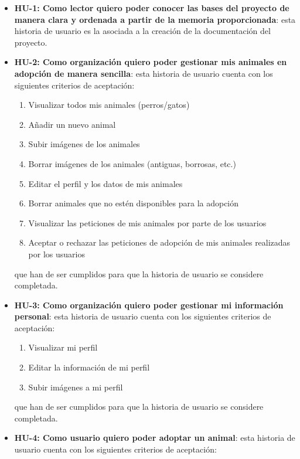 \begin{itemize}
    \item \textbf{HU-1: Como lector quiero poder conocer las bases del proyecto de manera clara y ordenada a partir de
    la memoria proporcionada}: esta historia de usuario es la asociada a la creación de la documentación del proyecto.
    \item \textbf{HU-2: Como organización quiero poder gestionar mis animales en adopción de manera sencilla}: esta
    historia de usuario cuenta con los siguientes criterios de aceptación:
        \begin{enumerate}
            \item Visualizar todos mis animales (perros/gatos)
            \item Añadir un nuevo animal
            \item Subir imágenes de los animales
            \item Borrar imágenes de los animales (antiguas, borrosas, etc.)
            \item Editar el perfil y los datos de mis animales
            \item Borrar animales que no estén disponibles para la adopción
            \item Visualizar las peticiones de mis animales por parte de los usuarios
            \item Aceptar o rechazar las peticiones de adopción de mis animales realizadas por los usuarios
        \end{enumerate}
    que han de ser cumplidos para que la historia de usuario se considere completada.
    \item \textbf{HU-3: Como organización quiero poder gestionar mi información personal}: esta historia de usuario cuenta
    con los siguientes criterios de aceptación:
        \begin{enumerate}
            \item Visualizar mi perfil
            \item Editar la información de mi perfil
            \item Subir imágenes a mi perfil
        \end{enumerate}
    que han de ser cumplidos para que la historia de usuario se considere completada.
    \item \textbf{HU-4: Como usuario quiero poder adoptar un animal}: esta historia de usuario cuenta con los siguientes
    criterios de aceptación:
        \begin{enumerate}

\end{enumerate}
\end{itemize}
